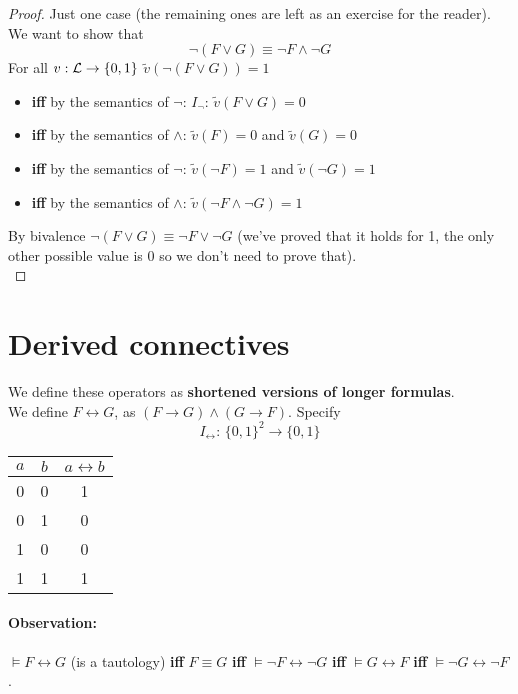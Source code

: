 	\begin{proof}
		Just one case (the remaining ones are left as an exercise for the reader). We want to show that
		$$ \neg (F \vee G) \equiv \neg F \wedge \neg G$$
		For all $v: \mathcal{L} \rightarrow \{0,1\}$ $\tilde{v} (\neg (F \vee G)) = 1$
		\begin{itemize}[label*=]
			\item \textbf{iff} by the semantics of $\neg$: $I_\neg$: $\tilde{v} (F \vee G) = 0$
			\item \textbf{iff} by the semantics of $\wedge$: $\tilde{v} (F) = 0$ and $\tilde{v}(G) = 0$
			\item \textbf{iff} by the semantics of $\neg$: $\tilde{v} (\neg F) = 1$ and $\tilde{v} (\neg G) = 1$
			\item \textbf{iff} by the semantics of $\wedge$: $\tilde{v} (\neg F \wedge \neg G) = 1$
		\end{itemize}

		By bivalence $\neg (F \vee G) \equiv \neg F \vee \neg G$ (we've proved that it holds for 1, the only other possible value is 0 so we don't need to prove that).\\
	\end{proof}

	\newpage

	\section{Derived connectives}
	We define these operators as \textbf{shortened versions of longer formulas}.\\

	We define $F \leftrightarrow G$, as $(F \rightarrow G) \wedge (G \rightarrow F)$. Specify
	$$ I_\leftrightarrow: \, \{0,1\}^2 \rightarrow \{0,1\} $$
	\begin{center}
		\begin{tabular}{c c | c}
			$a$ & $b$ & $a \leftrightarrow b$ \\
			\hline
			0 & 0 & 1 \\
			0 & 1 & 0\\
			1 & 0 & 0\\
			1 & 1 & 1
		\end{tabular}
	\end{center}

	\paragraph{Observation:} $\models F \leftrightarrow G$ (is a tautology) \textbf{iff} $F \equiv G$ \textbf{iff} $\models \neg F \leftrightarrow \neg G$ \textbf{iff} $\models G \leftrightarrow F$ \textbf{iff} $\models \neg G \leftrightarrow \neg F$.\\

